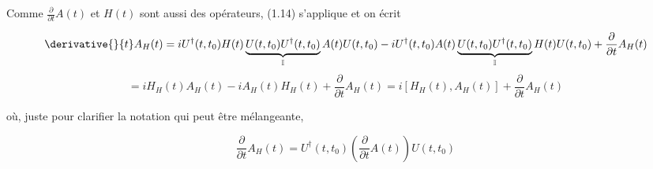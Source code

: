 Comme $\frac{\partial}{\partial t}A(t)$ et $H(t)$ sont aussi des opérateurs, (1.14) s'applique et on écrit

\begin{equation*}
    \derivative{}{t}A_H(t) = iU^\dagger(t,t_0)H(t)\underbrace{U(t,t_0)U^\dagger(t,t_0)}_\text{$\mathbb{I}$}A(t)U(t,t_0) - iU^\dagger(t,t_0)A(t)\underbrace{U(t,t_0)U^\dagger(t,t_0)}_\text{$\mathbb{I}$}H(t)U(t,t_0) + \frac{\partial}{\partial t}A_H(t)
\end{equation*}
\begin{equation}
    = iH_H(t)A_H(t) -iA_H(t)H_H(t) + \frac{\partial}{\partial t}A_H(t) = i\left[H_H(t), A_H(t)\right] + \frac{\partial}{\partial t}A_H(t)
\end{equation}

où, juste pour clarifier la notation qui peut être mélangeante, 

\begin{equation*}
    \frac{\partial}{\partial t}A_H(t) = U^\dagger(t,t_0)\left(\frac{\partial}{\partial t}A(t)\right)U(t,t_0) 
\end{equation*}


